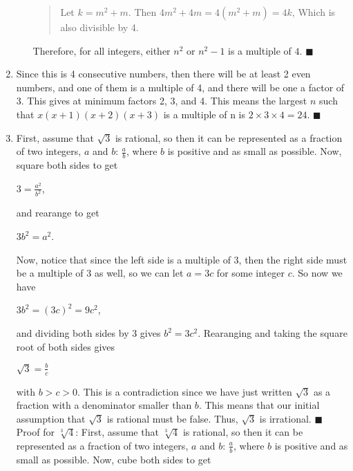 \documentclass[12pt]{article}
\begin{document}
\begin{enumerate}
\begin{enumerate}
\begin{quote}
\begin{center}
                        \end{center}
                        Let $k = m^2 + m$. Then
                        $4m^2 + 4m = 4(m^2+m) = 4k$,
                        Which is also divisible by 4.
                    \end{quote}
                    Therefore, for all integers, either $n^2$ or $n^2-1$ is a multiple
                    of $4$. \hfill $\blacksquare$
          \end{enumerate}
    \item Since this is 4 consecutive numbers, then there will be at least 2 even
          numbers, and one of them is a multiple of 4, and there will be one a factor of
          3. This gives at minimum factors 2, 3, and 4. This means the largest $n$ such
          that $x(x+1)(x+2)(x+3)$ is a multiple of n is $2 \times 3 \times 4 = 24$.
          \hfill $\blacksquare$
    \item First, assume that $\sqrt{3}$ is rational, so then it can be represented as a
          fraction of two integers, $a$ and $b$: $\frac{a}{b}$, where $b$ is positive and
          as small as possible. Now, square both sides to get
          \begin{center}
              $3 = \frac{a^2}{b^2}$,
          \end{center}
          and rearange to get
          \begin{center}
              $3b^2 = a^2$.
          \end{center}
          Now, notice that since the left side is a multiple of 3, then the right side
          must be a multiple of 3 as well, so we can let $a = 3c$ for some integer $c$.
          So now we have
          \begin{center}
              $3b^2 = (3c)^2 = 9c^2$,
          \end{center}
          and dividing both sides by 3 gives $b^2 = 3c^2$. Rearanging and taking the
          square root of both sides gives
          \begin{center}
              $\sqrt{3} = \frac{b}{c}$
          \end{center}
          with $b>c>0$. This is a contradiction since we have just written $\sqrt{3}$
          as a fraction with a denominator smaller than $b$. This means that our
          initial assumption that $\sqrt{3}$ is rational must be false. Thus, $\sqrt{3}$
          is irrational. \hfill $\blacksquare$\newline
          Proof for $\sqrt[3]{4}$:
          First, assume that $\sqrt[3]{4}$ is rational, so then it can be represented as a
          fraction of two integers, $a$ and $b$: $\frac{a}{b}$, where $b$ is positive and 
          as small as possible. Now, cube both sides to get
\end{enumerate}
\end{document}
